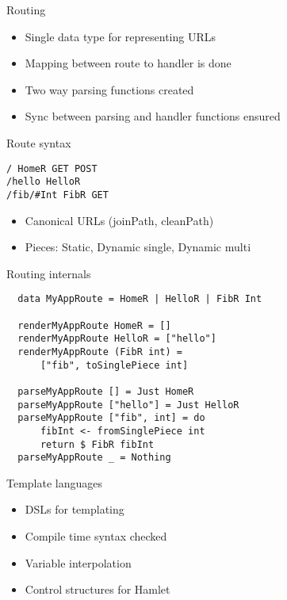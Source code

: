 \documentclass{beamer}
\begin{document}
\begin{frame}{Routing}
  \begin{itemize}
  \item Single data type for representing URLs
  \item Mapping between route to handler is done
  \item Two way parsing functions created
  \item Sync between parsing and handler functions ensured
  \end{itemize}
\end{frame}

\begin{frame}[fragile]{Route syntax}

  \begin{lstlisting}
/ HomeR GET POST
/hello HelloR
/fib/#Int FibR GET    
\end{lstlisting}

\begin{itemize}
\item Canonical URLs (joinPath, cleanPath)
\item Pieces: Static, Dynamic single, Dynamic multi  
\end{itemize}

\end{frame}

\begin{frame}[fragile]{Routing internals}
\begin{lstlisting}
  data MyAppRoute = HomeR | HelloR | FibR Int

  renderMyAppRoute HomeR = []
  renderMyAppRoute HelloR = ["hello"]
  renderMyAppRoute (FibR int) =
      ["fib", toSinglePiece int]

  parseMyAppRoute [] = Just HomeR
  parseMyAppRoute ["hello"] = Just HelloR
  parseMyAppRoute ["fib", int] = do
      fibInt <- fromSinglePiece int
      return $ FibR fibInt
  parseMyAppRoute _ = Nothing
\end{lstlisting}
\end{frame}

\begin{frame}{Template languages}
  \begin{itemize}
  \item DSLs for templating
  \item Compile time syntax checked
  \item Variable interpolation
  \item Control structures for Hamlet
  \end{itemize}
\end{frame}
\end{document}
